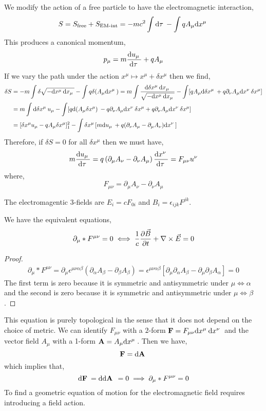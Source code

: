 \documentclass[11pt, a4paper]{article}
\begin{document}
We modify the action of a free particle to have the electromagnetic interaction,
\[ S = S_{\text{free}} + S_{\text{EM-int}} = - mc^2 \int \mathrm{d}\tau \: - \int q A_\mu \mathrm{d}x^\mu \: \]
This produces a canonical momentum,
\[ p_\mu = m \frac{\mathrm{d}u_\mu \:}{\mathrm{d}\tau \:} + q A_\mu \]
If we vary the path under the action $x^\mu \mapsto x^\mu + \delta x^\mu$ then we find,
\begin{align*}
\delta S & = - m \int \delta \sqrt{- \mathrm{d}x^\mu \: \mathrm{d}x_\mu \:} - \int q \delta(A_\mu \mathrm{d}x^\mu \:) = m \int \frac{\mathrm{d}\delta x^\mu \: \mathrm{d}x_\mu \:}{\sqrt{- \mathrm{d}x^\mu \: \mathrm{d}x_\mu \:}} - \int [q A_\mu \mathrm{d}\delta x^\mu \: + q \partial_\nu A_\mu \mathrm{d}x^\nu \: \delta x^\mu]
\\
& = m \int \mathrm{d}\delta x^\mu \: u_\mu - \int [q \mathrm{d}(A_\mu \delta x^\mu) \: - q \partial_\nu A_\mu \mathrm{d}x^\nu \: \delta x^\mu + q \partial_\nu A_\mu \mathrm{d}x^\nu \: \delta x^\mu]
\\
& = [\delta x^\mu u_\mu - q A_\mu \delta x^\mu]_1^2 - \int \delta x^\mu \left[ m \mathrm{d}u_\mu \: + q (\partial_\nu A_\mu - \partial_\mu A_\nu) \mathrm{d}x^\nu \: \right]
\end{align*}
Therefore, if $\delta S = 0$ for all $\delta x^\mu$ then we must have,
\[ m \frac{\mathrm{d}u_\mu \:}{\mathrm{d}\tau \:} = q \left( \partial_\mu A_\nu - \partial_\nu A_\mu \right) \frac{\mathrm{d}x^\nu \:}{\mathrm{d}\tau \:} = F_{\mu \nu} u^\nu \]
where,
\[ F_{\mu \nu} = \partial_\mu A_\nu - \partial_\nu A_\mu \]
\begin{definition}
The electromagentic 3-fields are $E_i = c F_{0i}$ and $B_i = \epsilon_{ijk} F^{jk}$. 
\end{definition}
\begin{proposition}
We have the equivalent equations,
\[ \partial_\mu * F^{\mu \nu} = 0 \iff \frac{1}{c} \frac{\partial{\vec{B}}}{\partial{t}} + \nabla \times \vec{E} = 0 \]
\end{proposition}
\begin{proof}
\begin{align*}
\partial_\mu * F^{\mu \nu} = \partial_\mu \epsilon^{\mu \nu \alpha \beta} (\partial_\alpha A_\beta - \partial_\beta A_\beta) = \epsilon^{\mu \nu \alpha \beta} \left[ \partial_\mu \partial_\alpha A_\beta - \partial_\mu \partial_\beta A_\alpha \right] = 0
\end{align*}
The first term is zero because it is symmetric and antisymmetric under $\mu \iff \alpha$ and the second is zero because it is symmetric and antisymmetric under $\mu \iff \beta$. 
\end{proof}

\begin{remark}
This equation is purely topological in the sense that it does  not depend on the choice of metric. We can identify $F_{\mu \nu}$ with a $2$-form $\mathbf{F} = F_{\mu \nu} \mathrm{d}x^\mu \: \mathrm{d}x^\nu \:$ and the vector field $A_\mu$ with a 1-form $\mathbf{A} = A_\mu \mathrm{d}x^\mu \:$. Then we have,
\[ \mathbf{F} = \mathrm{d}\mathbf{A} \: \]
which implies that,
\[ \mathrm{d}\mathbf{F} \: =\mathrm{d}\mathrm{d}\mathbf{A} \: \: = 0 \implies \partial_\mu * F^{\mu \nu} = 0 \]
To find a geometric equation of motion for the electromagnetic field requires introducing a field action.
\end{remark}
\end{document}
